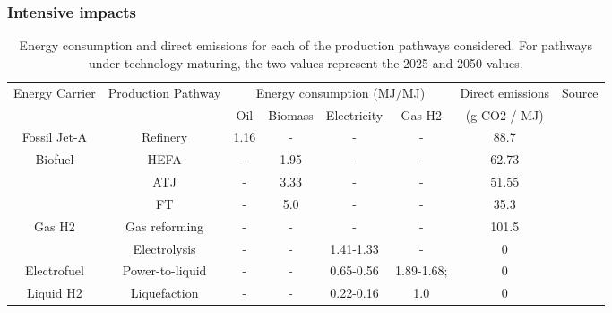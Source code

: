 \documentclass[
]{kaohandt}
\begin{document}

\subsubsection{Intensive impacts}

\begin{table}[b!]
    \caption{Energy consumption and direct emissions for each of the production pathways considered. For pathways under technology maturing, the two values represent the 2025 and 2050 values.}
    \footnotesize
    \centering
    \begin{tabular}{c c|c c c c|c|c}
    \toprule
    \multirow{2}{*}{Energy Carrier} & \multirow{2}{*}{Production Pathway}  & \multicolumn{4}{c|}{Energy consumption (MJ/MJ)} & Direct emissions  & \multirow{2}{*}{Source}   \\
    & & Oil & Biomass & Electricity & Gas H2 & (g CO2 / MJ) & \\
    \midrule
    Fossil Jet-A & Refinery & 1.16 & - & - & - & 88.7  &  \cite{jing_understanding_2022} \\
    \hline
    \multirow{3}{*}{Biofuel} & HEFA & - & 1.95 & - & - & 62.73 & \multirow{3}{*}{\cite{NEULING201854}} \\
    & ATJ & - & 3.33 & - & - & 51.55 & \\
    & FT & - & 5.0 & - & - & 35.3 & \\
    \hline
    \multirow{2}{*}{Gas H2} & Gas reforming & - & - & - & - & 101.5 & \cite{ji_h2} \\
    \cline{8-0}
     & Electrolysis & - & - & 1.41-1.33 & - & 0 & \multirow{3}{*}{\cite{wallington_green_2024}} \\
    \cline{1-7}
    Electrofuel & Power-to-liquid & - & - & 0.65-0.56 & 1.89-1.68; & 0  &   \\
    \cline{1-7}
    Liquid H2 & Liquefaction &  - & - & 0.22-0.16 & 1.0 & 0 &  \\
    \bottomrule
    \end{tabular}
    \label{tab:energy-prod}
\end{table}
\end{document}

